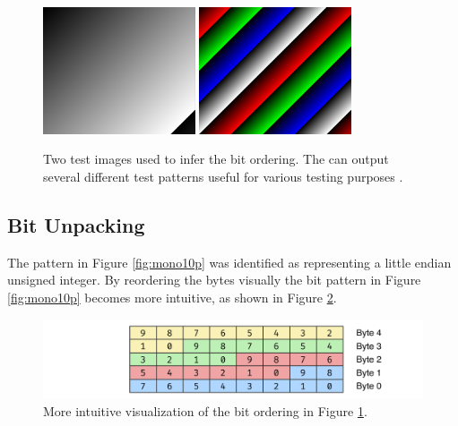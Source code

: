 \begin{figure}
    \centering
    \includegraphics[width=0.4\textwidth]{figures/unpacking/test_pattern0.jpg}
    \includegraphics[width=0.4\textwidth]{figures/unpacking/test_pattern2.jpg}
    \caption{Two test images used to infer the bit ordering.
        The \cam can output several different test patterns useful for various testing purposes \cite{lucidvisionlabsTritonMPPolarized2020}.}
    \label{fig:test_pattern}
\end{figure}


\subsection{Bit Unpacking}
The pattern in Figure \ref{fig:mono10p} was identified as representing a little endian unsigned integer.
By reordering the bytes visually the bit pattern in Figure \ref{fig:mono10p} becomes more intuitive, as shown in Figure \ref{fig:mono10p_reordered}.

\begin{figure}
    \centering
    \includegraphics[width=\textwidth]{figures/unpacking/layout_10p_be.pdf}
    \caption{More intuitive visualization of the bit ordering in Figure \ref{fig:test_pattern}.}
    \label{fig:mono10p_reordered}
\end{figure}

